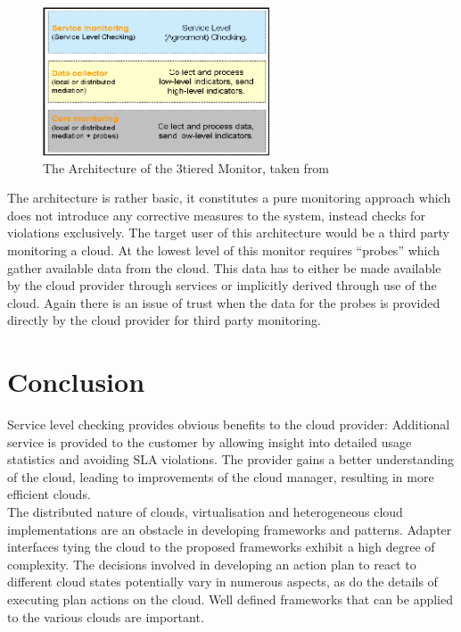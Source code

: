 \documentclass[a4paper]{llncs}
\begin{document}
\begin{figure}[Ht]
	\centering
		\includegraphics[width=0.6\textwidth]{figs/3tier_monitor.png}
	\caption{The Architecture of the 3tiered Monitor, taken from~\cite{Chazalet10}}
	\label{fig:3tier_monitor}
\end{figure}

The architecture is rather basic, it constitutes a pure monitoring approach which does not introduce any corrective measures to the system, instead checks for violations exclusively. The target user of this architecture would be a third party monitoring a cloud. At the lowest level of this monitor requires “probes” which gather available data from the cloud. This data has to either be made available by the cloud provider through services or implicitly derived through use of the cloud. Again there is an issue of trust when the data for the probes is provided directly by the cloud provider for third party monitoring.

\section{Conclusion}
Service level checking provides obvious benefits to the cloud provider: Additional service is provided to the customer by allowing insight into detailed usage statistics and avoiding SLA violations. The provider gains a better understanding of the cloud, leading to improvements of the cloud manager, resulting in more efficient clouds.\\

The distributed nature of clouds, virtualisation and heterogeneous cloud implementations are an obstacle in developing frameworks and patterns. Adapter interfaces tying the cloud to the proposed frameworks exhibit a high degree of complexity. The decisions involved in developing an action plan to react to different cloud states potentially vary in numerous aspects, as do the details of executing plan actions on the cloud. Well defined frameworks that can be applied to the various clouds are important.\\
\end{document}

